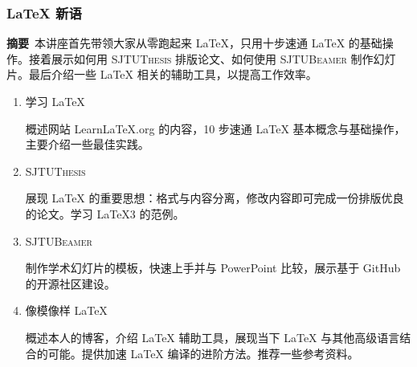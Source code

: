 \documentclass[UTF8]{ctexbeamer}
\begin{document}
    \begin{frame}
        \frametitle{\LaTeX{} 新语}

        {\scriptsize \textbf{摘要}~本讲座首先带领大家从零跑起来 \LaTeX{}，只用十步速通 \LaTeX{} 的基础操作。接着展示如何用 \textsc{SJTUThesis} 排版论文、如何使用 \textsc{SJTUBeamer} 制作幻灯片。最后介绍一些 \LaTeX{} 相关的辅助工具，以提高工作效率。\par}

        \begin{enumerate}
            \item 学习 \LaTeX{}
            
            {\scriptsize 概述网站 Learn\LaTeX{}.org 的内容，10 步速通 \LaTeX{} 基本概念与基础操作，主要介绍一些最佳实践。 \par}
            \item \textsc{SJTUThesis}
            
            {\scriptsize 展现 \LaTeX{} 的重要思想：格式与内容分离，修改内容即可完成一份排版优良的论文。学习 \LaTeX3 的范例。 \par}
            \item \textsc{SJTUBeamer}
            
            {\scriptsize 制作学术幻灯片的模板，快速上手并与 PowerPoint 比较，展示基于 GitHub 的开源社区建设。 \par}

            \item 像模像样 \LaTeX{}
            
            {\scriptsize 概述本人的博客，介绍 \LaTeX{} 辅助工具，展现当下 \LaTeX{} 与其他高级语言结合的可能。提供加速 \LaTeX{} 编译的进阶方法。推荐一些参考资料。\par}
        \end{enumerate}
    \end{frame}
\end{document}
